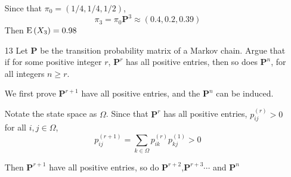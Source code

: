 \documentclass[en,hazy,blue,12pt,device = normal]{elegantnote}
\begin{document}
\begin{enumerate}
    \begin{tcolorbox}
        \sol

        Since that \(\pi_0 = (1/4,1/4,1/2)\),\[\pi_3 = \pi_0 \textbf{P}^3 \approx ({0.4, 0.2, 0.39})\]
        Then \(\operatorname E\left(X_3\right) = 0.98\)
    \end{tcolorbox}

    \item[13]Let \(\mathbf{P}\) be the transition probability matrix of a Markov chain. Argue that if for some positive integer \(r\), \(\mathbf{P}^r\) has all positive entries, then so does \(\mathbf{P}^n\), for all integers \(n \geqslant r\).
    
    \begin{tcolorbox}
        \sol

        We first prove \(\mathbf{P}^{r+1}\) have all positive entries, and the \(\mathbf{P}^n\) can be induced.

        Notate the state space as \(\Omega\). Since that \(\mathbf{P}^r\) has all positive entries, \(p_{ij }^{(r)} >0\) for all \(i,j\in\Omega\),
        \[p_{ij }^{(r+1)} = \sum_{k \in \Omega} p_{ik}^{(r)} p_{kj }^{(1)} > 0\]

        Then \(\mathbf{P}^{r+1}\) have all positive entries, so do \(\mathbf{P}^{r+2}\),\(\mathbf{P}^{r+3} \cdots\) and \(\mathbf{P}^{n}\)
    \end{tcolorbox}


\end{enumerate}
\end{document}
